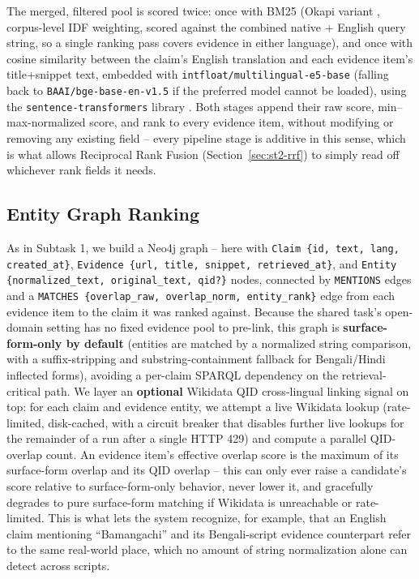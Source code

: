 \documentclass[
]{ceurart}
\begin{document}
The merged, filtered pool is scored twice: once with BM25 (Okapi
variant \cite{robertson2009probabilistic}, corpus-level IDF weighting,
scored against the combined native + English query string, so a single
ranking pass covers evidence in either language), and once with cosine
similarity between the claim's English translation and each evidence
item's title+snippet text, embedded with
\texttt{intfloat/multilingual-e5-base} \cite{wang2024multilingual}
(falling back to \texttt{BAAI/bge-base-en-v1.5} if the preferred model
cannot be loaded), using the \texttt{sentence-transformers} library
\cite{reimers2019sentencebert}. Both stages append their raw score,
min--max-normalized score, and rank to every evidence item, without
modifying or removing any existing field -- every pipeline stage is
additive in this sense, which is what allows Reciprocal Rank Fusion
(Section~\ref{sec:st2-rrf}) to simply read off whichever rank fields it
needs.

\subsection{Entity Graph Ranking}

As in Subtask 1, we build a Neo4j graph -- here with
\texttt{Claim \{id, text, lang, created\_at\}},
\texttt{Evidence \{url, title, snippet, retrieved\_at\}}, and
\texttt{Entity \{normalized\_text, original\_text, qid?\}} nodes,
connected by \texttt{MENTIONS} edges and a
\texttt{MATCHES \{overlap\_raw, overlap\_norm, entity\_rank\}} edge from
each evidence item to the claim it was ranked against. Because the
shared task's open-domain setting has no fixed evidence pool to
pre-link, this graph is \textbf{surface-form-only by default} (entities
are matched by a normalized string comparison, with a
suffix-stripping and substring-containment fallback for Bengali/Hindi
inflected forms), avoiding a per-claim SPARQL dependency on the
retrieval-critical path. We layer an \textbf{optional} Wikidata QID
cross-lingual linking signal on top: for each claim and evidence
entity, we attempt a live Wikidata lookup (rate-limited, disk-cached,
with a circuit breaker that disables further live lookups for the
remainder of a run after a single HTTP 429) and compute a parallel
QID-overlap count. An evidence item's effective overlap score is the
maximum of its surface-form overlap and its QID overlap -- this can
only ever raise a candidate's score relative to surface-form-only
behavior, never lower it, and gracefully degrades to pure surface-form
matching if Wikidata is unreachable or rate-limited. This is what lets
the system recognize, for example, that an English claim mentioning
``Bamangachi'' and its Bengali-script evidence counterpart refer to the
same real-world place, which no amount of string normalization alone
can detect across scripts.
\end{document}
